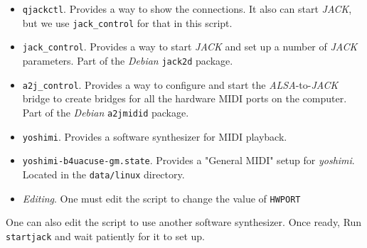    \begin{itemize}
      \item \texttt{qjackctl}.  Provides a way to show the connections. It also
         can start \textsl{JACK}, but we use \texttt{jack\_control} for that in
         this script.
      \item \texttt{jack\_control}.  Provides a way to start \textsl{JACK}
         and set up a number of \textsl{JACK} parameters.
         Part of the \textsl{Debian} \texttt{jack2d} package.
      \item \texttt{a2j\_control}.  Provides a way to configure and start the
         \textsl{ALSA}-to-\textsl{JACK} bridge to create bridges for all the
         hardware MIDI ports on the computer.
         Part of the \textsl{Debian} \texttt{a2jmidid} package.
      \item \texttt{yoshimi}.  Provides a software synthesizer for MIDI
         playback.
      \item \texttt{yoshimi-b4uacuse-gm.state}.  Provides a "General MIDI"
      setup for \textsl{yoshimi}.  Located in the \texttt{data/linux}
      directory.
      \item \textsl{Editing}.  One must edit the script to change the value of
      \texttt{HWPORT}
   \end{itemize}

   One can also edit the script to use another software synthesizer.
   Once ready, 
   Run \texttt{startjack} and wait patiently for it to set up.

